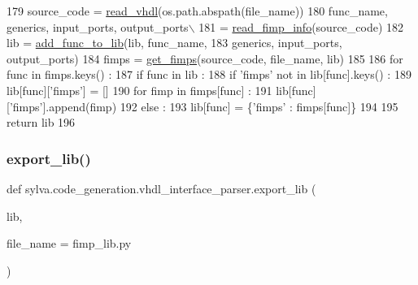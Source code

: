 \begin{DoxyCode}
179       source\_code = \hyperlink{namespacesylva_1_1code__generation_1_1vhdl__interface__parser_afc25f8fd1bfc69960af11938f1e9b305}{read\_vhdl}(os.path.abspath(file\_name))
180       func\_name, generics, input\_ports, output\_ports\(\backslash\)
181       = \hyperlink{namespacesylva_1_1code__generation_1_1vhdl__interface__parser_af04b13914bd754706782c30d090504f5}{read\_fimp\_info}(source\_code)
182       lib = \hyperlink{namespacesylva_1_1code__generation_1_1vhdl__interface__parser_a58b4385448eeafc249f2d5ca96664814}{add\_func\_to\_lib}(lib, func\_name,
183         generics, input\_ports, output\_ports)
184       fimps = \hyperlink{namespacesylva_1_1code__generation_1_1vhdl__interface__parser_a58e8d5a1d080f5c440889bddbbbb514a}{get\_fimps}(source\_code, file\_name, lib)
185 
186       \textcolor{keywordflow}{for} func \textcolor{keywordflow}{in} fimps.keys() :
187         \textcolor{keywordflow}{if} func \textcolor{keywordflow}{in} lib :
188           \textcolor{keywordflow}{if} \textcolor{stringliteral}{'fimps'} \textcolor{keywordflow}{not} \textcolor{keywordflow}{in} lib[func].keys() :
189             lib[func][\textcolor{stringliteral}{'fimps'}] = []
190           \textcolor{keywordflow}{for} fimp \textcolor{keywordflow}{in} fimps[func] :
191             lib[func][\textcolor{stringliteral}{'fimps'}].append(fimp)
192         \textcolor{keywordflow}{else} :
193           lib[func] = \{\textcolor{stringliteral}{'fimps'} : fimps[func]\}
194 
195   \textcolor{keywordflow}{return} lib
196 
\end{DoxyCode}
\mbox{\label{namespacesylva_1_1code__generation_1_1vhdl__interface__parser_af7576699c6ef184fb26f0988bd9ab795}} 
\subsubsection{\texorpdfstring{export\+\_\+lib()}{export\_lib()}}
{\footnotesize\ttfamily def sylva.\+code\+\_\+generation.\+vhdl\+\_\+interface\+\_\+parser.\+export\+\_\+lib (\begin{DoxyParamCaption}\item[{}]{lib,  }\item[{}]{file\+\_\+name = {\ttfamily \textquotesingle{}fimp\+\_\+lib.py\textquotesingle{}} }\end{DoxyParamCaption})}



